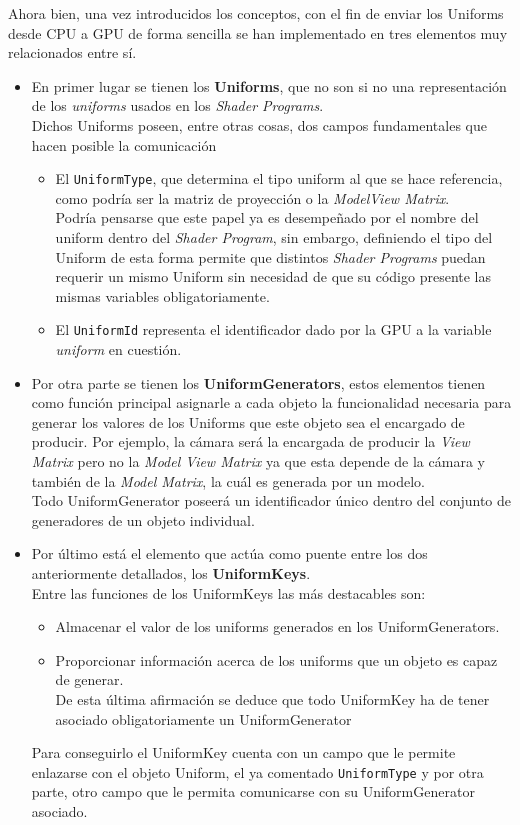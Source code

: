 Ahora bien, una vez introducidos los conceptos, con el fin de enviar los Uniforms desde CPU a GPU de forma sencilla se han implementado en \robotto tres elementos muy relacionados entre sí.\\
\begin{itemize}
\item En primer lugar se tienen los \textbf{Uniforms}, que no son si no una representación de los \textit{uniforms} usados en los \textit{Shader Programs}.\\
Dichos Uniforms poseen, entre otras cosas, dos campos fundamentales que hacen posible la comunicación
\begin{itemize}
\item El \texttt{UniformType}, que determina el tipo uniform al que se hace referencia, como podría ser la matriz de proyección o la \textit{ModelView Matrix}.\\
Podría pensarse que este papel ya es desempeñado por el nombre del uniform dentro del \textit{Shader Program}, sin embargo, definiendo el tipo del Uniform de esta forma permite que distintos \textit{Shader Programs} puedan requerir un mismo Uniform sin necesidad de que su código presente las mismas variables obligatoriamente.
\item El \texttt{UniformId} representa el identificador dado por la GPU a la variable \textit{uniform} en cuestión.
\end{itemize}
\item Por otra parte se tienen los \textbf{UniformGenerators}, estos elementos tienen como función principal asignarle a cada objeto la funcionalidad necesaria para generar los valores de los Uniforms que este objeto sea el encargado de producir. Por ejemplo, la cámara será la encargada de producir la \textit{View Matrix} pero no la \textit{Model View Matrix} ya que esta depende de la cámara y también de la \textit{Model Matrix}, la cuál es generada por un modelo.\\
Todo UniformGenerator poseerá un identificador único dentro del conjunto de generadores de un objeto individual.
\item Por último está el elemento que actúa como puente entre los dos anteriormente detallados, los \textbf{UniformKeys}.\\
Entre las funciones de los UniformKeys las más destacables son:
\begin{itemize}
\item Almacenar el valor de los uniforms generados en los UniformGenerators.
\item Proporcionar información acerca de los uniforms que un objeto es capaz de generar.\\
De esta última afirmación se deduce que todo UniformKey ha de tener asociado obligatoriamente un UniformGenerator
\end{itemize}
Para conseguirlo el UniformKey cuenta con un campo que le permite enlazarse con el objeto Uniform, el ya comentado \texttt{UniformType} y por otra parte, otro campo que le permita comunicarse con su UniformGenerator asociado.
\end{itemize}

